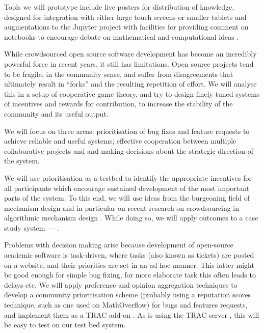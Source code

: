 \begin{workpackage}[id=social-aspects,wphases=0-48,
  title=Social Aspects,
  lead=UO,
  UORM=23,USHRM=18,USORM=6]
\begin{tasklist}
\begin{task}[title=Implications of VREs for Publication,id=social-output,lead=USH,PM=12,partners={UO}]
  Tools we will prototype include live posters for distribution of
  knowledge, designed for integration with either large touch screens
  or smaller tablets  and augmentations
  to the Jupyter project with facilities for providing comment on
  notebooks to encourage debate on mathematical and computational
  ideas .
\end{task}


\begin{task}[title=Mechanism Design for free software development,PM=15,lead=UO,
id=isocial-decisionmaking]

While crowdsourced open source software development has become an
incredibly powerful force in recent years, it still has limitations. 
Open source projects tend to be fragile, in the community sense, and
suffer from disagreements that ultimately result in ``forks'' and the
resulting repetition of effort. We will analyse this in a setup of
cooperative game theory, and try to design finely tuned systems of
incentives and rewards for contribution, to increase the stability of
the community and its useful output.

We will focus on three areas: prioritisation of bug fixes and feature
requests to achieve reliable and useful systems; effective cooperation between multiple collaborative
projects and and making decisions about
the strategic direction of the system.  

We will use prioritisation as a testbed to identify the appropriate incentives for all
participants which encourage sustained development
of the most important parts of the system.
To this end, we will use
ideas from the burgeoning field of mechanism design \cite{AGTbook} and
in particular on recent research on crowdsourcing in algorithmic
mechanism design \cite{crowds}.  While doing so, we will apply
outcomes to a case study system --- \Sage.  

Problems with decision making arise because 
development of open-source academic software is task-driven,
where tasks (also known as tickets) are posted on a website, and their
priorities are set in an ad hoc manner.  This latter might be
good enough for simple bug fixing, for more elaborate task this often
leads to delays etc.  
We will apply preference
and opinion aggregation techniques \cite{pref-aggr} to develop a
community prioritisation scheme (probably using a reputation scores
technique, such as one used on MathOverflow) for bugs and features requests,
and implement them as a TRAC \cite{Trac} add-on 
.
As \Sage is using the TRAC server \cite{trac-sagemath}, 
this will be easy to test on our test bed system.


\end{task}
\end{tasklist}
\end{workpackage}
